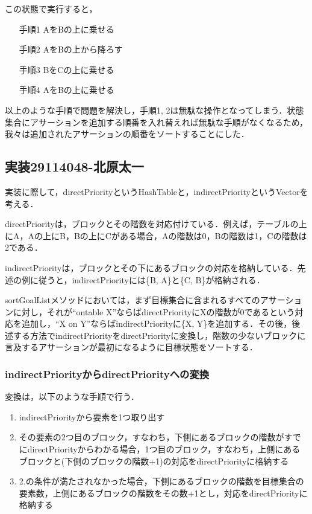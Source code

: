 \documentclass{jarticle}
\begin{document}
この状態で実行すると，
\begin{enumerate}
\item[手順1] AをBの上に乗せる
\item[手順2] AをBの上から降ろす
\item[手順3] BをCの上に乗せる
\item[手順4] AをBの上に乗せる
\end{enumerate}
以上のような手順で問題を解決し，手順1, 2は無駄な操作となってしまう．状態集合にアサーションを追加する順番を入れ替えれば無駄な手順がなくなるため，我々は追加されたアサーションの順番をソートすることにした．

\subsection{実装29114048-北原太一}
実装に際して，directPriorityというHashTableと，indirectPriorityというVectorを考える．

directPriorityは，ブロックとその階数を対応付けている．例えば，テーブルの上にA，Aの上にB，Bの上にCがある場合，Aの階数は0，Bの階数は1，Cの階数は2である．

indirectPriorityは，ブロックとその下にあるブロックの対応を格納している．先述の例に従うと，indirectPriorityには\{B, A\}と\{C, B\}が格納される．
  
sortGoalListメソッドにおいては，まず目標集合に含まれるすべてのアサーションに対し，それが``ontable X''ならばdirectPriorityにXの階数が0であるという対応を追加し，``X on Y''ならばindirectPriorityに\{X, Y\}を追加する．その後，後述する方法でindirectPriorityをdirectPriorityに変換し，階数の少ないブロックに言及するアサーションが最初になるように目標状態をソートする．

\subsubsection{indirectPriorityからdirectPriorityへの変換}
変換は，以下のような手順で行う．
\begin{enumerate}
\item indirectPriorityから要素を1つ取り出す
\item その要素の2つ目のブロック，すなわち，下側にあるブロックの階数がすでにdirectPriorityからわかる場合，1つ目のブロック，すなわち，上側にあるブロックと(下側のブロックの階数+1)の対応をdirectPriorityに格納する
\item 2.の条件が満たされなかった場合，下側にあるブロックの階数を目標集合の要素数，上側にあるブロックの階数をその数+1とし，対応をdirectPriorityに格納する
\end{enumerate}
\end{document}
